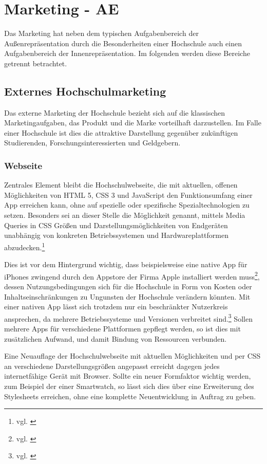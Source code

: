 \section{Marketing - AE}
\label{section_marketing}
Das Marketing hat neben dem typischen Aufgabenbereich der Außenrepräsentation durch die Besonderheiten einer Hochschule auch einen Aufgabenbereich der Innenrepräsentation. Im folgenden werden diese Bereiche getrennt betrachtet.

\subsection{Externes Hochschulmarketing}
\label{subsection_externes_hochschulemarketing}
Das externe Marketing der Hochschule bezieht sich auf die klassischen Marketingaufgaben, das Produkt und die Marke vorteilhaft darzustellen. Im Falle einer Hochschule ist dies die attraktive Darstellung gegenüber zukünftigen Studierenden, Forschungsinteressierten und Geldgebern.

\subsubsection{Webseite}
Zentrales Element bleibt die Hochschulwebseite, die mit aktuellen, offenen Möglichkeiten von HTML 5, CSS 3 und JavaScript den Funktionsumfang einer App erreichen kann, ohne auf spezielle oder spezifische Spezialtechnologien zu setzen. Besonders sei an dieser Stelle die Möglichkeit genannt, mittels Media Queries in CSS Größen und Darstellungsmöglichkeiten von Endgeräten unabhängig von konkreten Betriebssystemen und Hardwareplattformen abzudecken.\footnote{vgl. \cite{w3c_media_queries_url}}

Dies ist vor dem Hintergrund wichtig, dass beispielsweise eine native App für iPhones zwingend durch den Appstore der Firma Apple installiert werden muss\footnote{vgl. \cite{apple_app_distribution_guide_url}}, dessen Nutzungsbedingungen sich für die Hochschule in Form von Kosten oder Inhaltseinschränkungen zu Ungunsten der Hochschule verändern könnten. Mit einer nativen App lässt sich trotzdem nur ein beschränkter Nutzerkreis ansprechen, da mehrere Betriebssysteme und Versionen verbreitet sind.\footnote{vgl. \cite{kantarworldpanel_mobile_betriebssysteme_url}} Sollen mehrere Apps für verschiedene Plattformen gepflegt werden, so ist dies mit zusätzlichen Aufwand, und damit Bindung von Ressourcen verbunden.

Eine Neuauflage der Hochschulwebseite mit aktuellen Möglichkeiten und per CSS an verschiedene Darstellungsgrößen angepasst erreicht dagegen jedes internetfähige Gerät mit Browser. Sollte ein neuer Formfaktor wichtig werden, zum Beispiel der einer Smartwatch, so lässt sich dies über eine Erweiterung des Stylesheets erreichen, ohne eine komplette Neuentwicklung in Auftrag zu geben.

